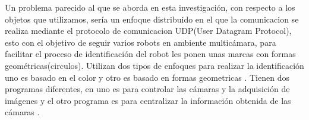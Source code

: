 Un problema parecido al que se aborda en esta investigaci\'on, con respecto a los objetos que utilizamos, ser\'ia un enfoque distribuido en el que la comunicacion se realiza mediante el protocolo de comunicacion UDP(User Datagram Protocol), esto con el objetivo de seguir varios robots en ambiente multic\'amara, para facilitar el proceso de identificaci\'on del robot les ponen unas marcas con formas geom\'etricas(circulos). Utilizan dos tipos de enfoques para realizar la identificaci\'on uno es basado en el color y otro es basado en formas geometricas . Tienen dos programas diferentes, en uno es para controlar las c\'amaras y la adquisici\'on de im\'agenes y el otro programa es para centralizar la informaci\'on obtenida de las c\'amaras \cite{garcia_mot}. \\

